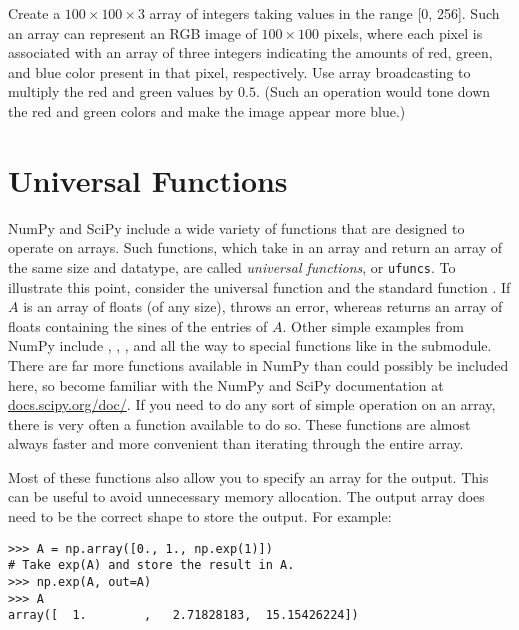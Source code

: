 \begin{problem}
Create a $100\times100\times3$ array of integers taking values in the range 
[0, 256]. Such an array can represent an RGB image of $100\times100$ pixels, 
where each pixel is associated with an array of three integers indicating the 
amounts of red, green, and blue color present in that pixel, respectively.
Use array broadcasting to multiply the red and green values by $0.5$. 
(Such an operation would tone down the red and green colors and make the 
image appear more blue.) 
\end{problem}

\section*{Universal Functions}
NumPy and SciPy include a wide variety of functions that are designed to 
operate on arrays. Such functions, which take in an array and return an array 
of the same size and datatype, are called \emph{universal functions}, or 
\texttt{ufuncs}. To illustrate this point, consider the universal function 
 and the standard function . If $A$ is an array 
of floats (of any size),  throws an error, whereas 
 returns an array of floats containing the sines of the 
entries of $A$. Other simple examples from NumPy include , , 
, and  all the way to special functions like  
in the  submodule. There are far more functions available in 
NumPy than could possibly be included here, so become 
familiar with the NumPy and SciPy documentation at \url{docs.scipy.org/doc/}.
If you need to do any sort of simple operation on an array, there is very 
often a function available to do so. These functions are almost always faster and 
more convenient than iterating through the entire array.

Most of these functions also allow you to specify an array for the output.
This can be useful to avoid unnecessary memory allocation. The output array does need to be the correct shape 
to store the output.
For example:

\begin{lstlisting}
>>> A = np.array([0., 1., np.exp(1)])
# Take exp(A) and store the result in A.
>>> np.exp(A, out=A) 
>>> A
array([  1.        ,   2.71828183,  15.15426224])
\end{lstlisting}

\begin{comment}
Other useful examples are \li{max}, \li{min}, \li{absolute}, and \li{average}.
Each of these operations also allows you to specify whether you want to 
operate across a particular axis or over the entire array.
For example:

The above example returns a row of A which represents the maximum of all the 
rows of A. If we had set \li{axis=1}, it would have taken the maximum of all 
the columns. If, for purposes of broadcasting (discussed later) you need the 
output of one of these functions to have the same number of dimensions as the 
original array, you can also include the argument \li{keepdims=True}.

\end{comment}

